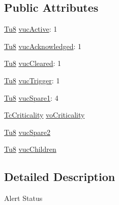 \subsection*{Public Attributes}
\begin{DoxyCompactItemize}
\item 
\mbox{\hyperlink{namespace_g_n_common_a7939e251ddbf5d3a31832dcfdc8bde39}{Tu8}} \mbox{\hyperlink{class_g_n_common_1_1_n_notification_1_1_tc_status_a69149fc8c4c5facf147993b95d171c10}{vuc\+Active}}\+: 1
\item 
\mbox{\hyperlink{namespace_g_n_common_a7939e251ddbf5d3a31832dcfdc8bde39}{Tu8}} \mbox{\hyperlink{class_g_n_common_1_1_n_notification_1_1_tc_status_a487d66407748b7a91d9d663c3fab0f2c}{vuc\+Acknowledged}}\+: 1
\item 
\mbox{\hyperlink{namespace_g_n_common_a7939e251ddbf5d3a31832dcfdc8bde39}{Tu8}} \mbox{\hyperlink{class_g_n_common_1_1_n_notification_1_1_tc_status_a36e84f5ebb3fda08f3ddaccde0a1c37b}{vuc\+Cleared}}\+: 1
\item 
\mbox{\hyperlink{namespace_g_n_common_a7939e251ddbf5d3a31832dcfdc8bde39}{Tu8}} \mbox{\hyperlink{class_g_n_common_1_1_n_notification_1_1_tc_status_a4af337a51278a09d8500bab15d929af3}{vuc\+Trigger}}\+: 1
\item 
\mbox{\hyperlink{namespace_g_n_common_a7939e251ddbf5d3a31832dcfdc8bde39}{Tu8}} \mbox{\hyperlink{class_g_n_common_1_1_n_notification_1_1_tc_status_ad8eff97b5c02e0409d3cbc65bf65c313}{vuc\+Spare1}}\+: 4
\item 
\mbox{\hyperlink{namespace_g_n_common_1_1_n_notification_a7d5c0650483fe26fa420ae5bf787566b}{Tc\+Criticality}} \mbox{\hyperlink{class_g_n_common_1_1_n_notification_1_1_tc_status_a2f8cb2528ae8cba51e3acc7f28eb2eeb}{vo\+Criticality}}
\item 
\mbox{\hyperlink{namespace_g_n_common_a7939e251ddbf5d3a31832dcfdc8bde39}{Tu8}} \mbox{\hyperlink{class_g_n_common_1_1_n_notification_1_1_tc_status_aaee139b3984634b3cc3cc7e2b7175035}{vuc\+Spare2}}
\item 
\mbox{\hyperlink{namespace_g_n_common_a7939e251ddbf5d3a31832dcfdc8bde39}{Tu8}} \mbox{\hyperlink{class_g_n_common_1_1_n_notification_1_1_tc_status_ae398de0e32d0352b0437f4267247fd6d}{vuc\+Children}}
\end{DoxyCompactItemize}


\subsection{Detailed Description}
Alert Status 

